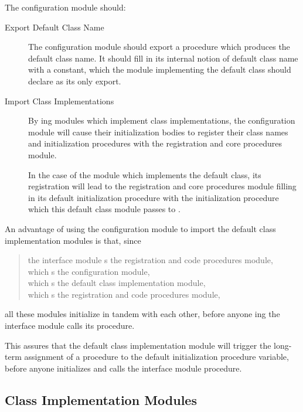 The configuration module should:
\begin{description}
\item[Export Default Class Name]\indent\par
 The configuration module should export a procedure which produces 
 the default class name.
 It should fill in its internal notion of default class name with a
  constant, which the module implementing the default
 class should declare as its only export.

\item[Import Class Implementations]\indent\par
 By ing modules which implement class implementations, the
 configuration module will cause their initialization bodies to register
 their class names and initialization procedures with the registration
 and core procedures module.

 In the case of the module which implements the default class, its
 registration will lead to the registration and core procedures module
 filling in its default initialization procedure with the initialization
 procedure which this default class module passes to .

\end{description}

An advantage of using the configuration module to import the default
class implementation modules is that, since
\begin{quote}
the interface module s the registration and code procedures
module, \\
which s the configuration module, \\
which s the default class implementation module, \\
which s the registration and code procedures module,
\end{quote}
all these modules initialize in tandem with each other, before anyone
ing the interface module calls its  procedure.

This assures that the default class implementation module will trigger
the long-term assignment of a procedure to the default initialization
procedure variable, before anyone initializes and calls the interface module
 procedure.

\subsection{Class Implementation Modules}

